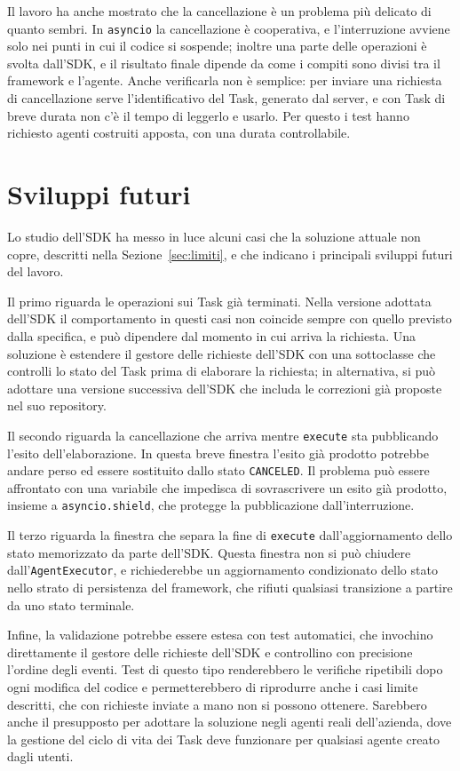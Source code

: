 Il lavoro ha anche mostrato che la cancellazione è un problema più delicato di quanto sembri. In \texttt{asyncio} la cancellazione è cooperativa, e l'interruzione avviene solo nei punti in cui il codice si sospende; inoltre una parte delle operazioni è svolta dall'SDK, e il risultato finale dipende da come i compiti sono divisi tra il framework e l'agente. Anche verificarla non è semplice: per inviare una richiesta di cancellazione serve l'identificativo del Task, generato dal server, e con Task di breve durata non c'è il tempo di leggerlo e usarlo. Per questo i test hanno richiesto agenti costruiti apposta, con una durata controllabile.

\section*{Sviluppi futuri}

Lo studio dell'SDK ha messo in luce alcuni casi che la soluzione attuale non copre, descritti nella Sezione~\ref{sec:limiti}, e che indicano i principali sviluppi futuri del lavoro.

Il primo riguarda le operazioni sui Task già terminati. Nella versione adottata dell'SDK il comportamento in questi casi non coincide sempre con quello previsto dalla specifica, e può dipendere dal momento in cui arriva la richiesta. Una soluzione è estendere il gestore delle richieste dell'SDK con una sottoclasse che controlli lo stato del Task prima di elaborare la richiesta; in alternativa, si può adottare una versione successiva dell'SDK che includa le correzioni già proposte nel suo repository.

Il secondo riguarda la cancellazione che arriva mentre \texttt{execute} sta pubblicando l'esito dell'elaborazione. In questa breve finestra l'esito già prodotto potrebbe andare perso ed essere sostituito dallo stato \texttt{CANCELED}. Il problema può essere affrontato con una variabile che impedisca di sovrascrivere un esito già prodotto, insieme a \texttt{asyncio.shield}, che protegge la pubblicazione dall'interruzione.

Il terzo riguarda la finestra che separa la fine di \texttt{execute} dall'aggiornamento dello stato memorizzato da parte dell'SDK. Questa finestra non si può chiudere dall'\texttt{AgentExecutor}, e richiederebbe un aggiornamento condizionato dello stato nello strato di persistenza del framework, che rifiuti qualsiasi transizione a partire da uno stato terminale.

Infine, la validazione potrebbe essere estesa con test automatici, che invochino direttamente il gestore delle richieste dell'SDK e controllino con precisione l'ordine degli eventi. Test di questo tipo renderebbero le verifiche ripetibili dopo ogni modifica del codice e permetterebbero di riprodurre anche i casi limite descritti, che con richieste inviate a mano non si possono ottenere. Sarebbero anche il presupposto per adottare la soluzione negli agenti reali dell'azienda, dove la gestione del ciclo di vita dei Task deve funzionare per qualsiasi agente creato dagli utenti.
